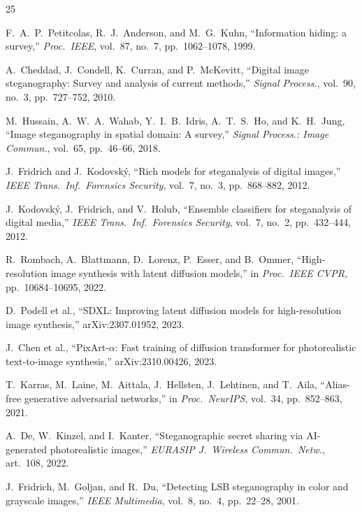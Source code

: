 \documentclass[10pt,twocolumn,a4paper]{article}
\begin{document}
\begin{thebibliography}{25}
\small

F.~A.~P.~Petitcolas, R.~J.~Anderson, and M.~G.~Kuhn,
``Information hiding: a survey,''
\textit{Proc.\ IEEE}, vol.~87, no.~7, pp.~1062--1078, 1999.

A.~Cheddad, J.~Condell, K.~Curran, and P.~McKevitt,
``Digital image steganography: Survey and analysis of current methods,''
\textit{Signal Process.}, vol.~90, no.~3, pp.~727--752, 2010.

M.~Hussain, A.~W.~A.~Wahab, Y.~I.~B.~Idris, A.~T.~S.~Ho, and K.~H.~Jung,
``Image steganography in spatial domain: A survey,''
\textit{Signal Process.: Image Commun.}, vol.~65, pp.~46--66, 2018.

J.~Fridrich and J.~Kodovsk\'{y},
``Rich models for steganalysis of digital images,''
\textit{IEEE Trans.\ Inf.\ Forensics Security}, vol.~7, no.~3, pp.~868--882, 2012.

J.~Kodovsk\'{y}, J.~Fridrich, and V.~Holub,
``Ensemble classifiers for steganalysis of digital media,''
\textit{IEEE Trans.\ Inf.\ Forensics Security}, vol.~7, no.~2, pp.~432--444, 2012.

R.~Rombach, A.~Blattmann, D.~Lorenz, P.~Esser, and B.~Ommer,
``High-resolution image synthesis with latent diffusion models,''
in \textit{Proc.\ IEEE CVPR}, pp.~10684--10695, 2022.

D.~Podell et al.,
``SDXL: Improving latent diffusion models for high-resolution image synthesis,''
arXiv:2307.01952, 2023.

J.~Chen et al.,
``PixArt-$\alpha$: Fast training of diffusion transformer for photorealistic text-to-image synthesis,''
arXiv:2310.00426, 2023.

T.~Karras, M.~Laine, M.~Aittala, J.~Hellsten, J.~Lehtinen, and T.~Aila,
``Alias-free generative adversarial networks,''
in \textit{Proc.\ NeurIPS}, vol.~34, pp.~852--863, 2021.

A.~De, W.~Kinzel, and I.~Kanter,
``Steganographic secret sharing via AI-generated photorealistic images,''
\textit{EURASIP J.\ Wireless Commun.\ Netw.}, art.~108, 2022.

J.~Fridrich, M.~Goljan, and R.~Du,
``Detecting LSB steganography in color and grayscale images,''
\textit{IEEE Multimedia}, vol.~8, no.~4, pp.~22--28, 2001.


\end{thebibliography}
\end{document}
